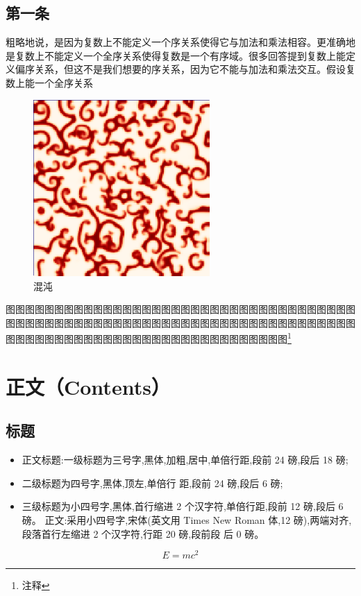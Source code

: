 \documentclass{LZU}
\begin{document}
\subsection{第一条}
粗略地说，是因为复数上不能定义一个序关系使得它与加法和乘法相容。更准确地是复数上不能定义一个全序关系使得复数是一个有序域。很多回答提到复数上能定义偏序关系，但这不是我们想要的序关系，因为它不能与加法和乘法交互。假设复数上能一个全序关系
\begin{figure}[htpb]
    \centering
    \includegraphics[width=0.6\textwidth]{pic/chaos.png}
    \caption{混沌}
    \label{fig:chaos}
\end{figure}
图图图图图图图图图图图图图图图图图图图图图图图图图图图图图图图图图图图图图图图图图图图图图图图图图图图图图图图图图图图图图图图图图图图图图图图图图图图图图图图图图图图图图图图图图图图图图图图图图图图图图\footnote{注释}
\section{正文（Contents）}
\subsection{标题}
\begin{itemize}
    \item 正文标题:一级标题为三号字,黑体,加粗,居中,单倍行距,段前 24 磅,段后 18 磅;
    \item 二级标题为四号字,黑体,顶左,单倍行 距,段前 24 磅,段后 6 磅;
    \item 三级标题为小四号字,黑体,首行缩进 2 个汉字符,单倍行距,段前 12 磅,段后 6 磅。 正文:采用小四号字,宋体(英文用 Times New Roman 体,12 磅),两端对齐,段落首行左缩进 2 个汉字符,行距 20 磅,段前段 后 0 磅。
\end{itemize}
\begin{equation}
    E=mc^2
\end{equation}
\end{document}
